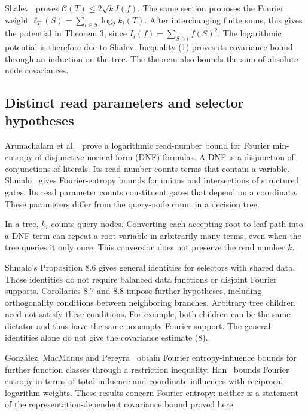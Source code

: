 \documentclass[
  american,
  11pt,
]{article}
\newcounter{none} %
\begin{document}
Shalev~\cite[Section~6.2, Theorem~31]{Shalev} proves
\(\mathcal C(T)\leq2\sqrt{k}I(f)\). The same section proposes the
Fourier weight \(\ell_T(S)=\sum_{i\in S}\log_2 k_i(T)\). After
interchanging finite sums, this gives the potential in Theorem 3, since
\(I_i(f)=\sum_{S\ni i}\widehat f(S)^2\). The logarithmic potential is
therefore due to Shalev. Inequality (1) proves its covariance bound
through an induction on the tree. The theorem also bounds the sum of
absolute node covariances.

\subsection{Distinct read parameters and selector
hypotheses}\label{distinct-read-parameters-and-selector-hypotheses}

Arunachalam et al.~\cite{ACKSW} prove a logarithmic read-number bound for Fourier
min-entropy of disjunctive normal form (DNF) formulas. A DNF is a
disjunction of conjunctions of literals. Its read number counts terms
that contain a variable. Shmalo~\cite[Theorem~5.1]{Shmalo} gives Fourier-entropy
bounds for unions and intersections of structured gates. Its read
parameter counts constituent gates that depend on a coordinate. These
parameters differ from the query-node count in a decision tree.

In a tree, \(k_i\) counts query nodes. Converting each accepting
root-to-leaf path into a DNF term can repeat a root variable in
arbitrarily many terms, even when the tree queries it only once. This
conversion does not preserve the read number \(k\).

Shmalo's Proposition 8.6 gives general identities for selectors with
shared data. Those identities do not require balanced data functions or
disjoint Fourier supports. Corollaries 8.7 and 8.8 impose further
hypotheses, including orthogonality conditions between neighboring
branches. Arbitrary tree children need not satisfy these conditions. For
example, both children can be the same dictator and thus have the same
nonempty Fourier support. The general identities alone do not give the
covariance estimate (8).

González, MacManus and Pereyra~\cite{GMP} obtain Fourier entropy-influence bounds
for further function classes through a restriction inequality.
Han~\cite{Han} bounds Fourier entropy in terms of total influence and coordinate
influences with reciprocal-logarithm weights. These results concern
Fourier entropy; neither is a statement of the representation-dependent
covariance bound proved here.
\end{document}
